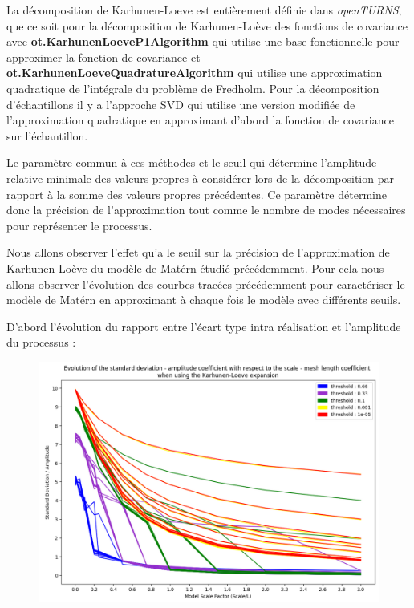 \documentclass[a4paper,10pt]{article}
\begin{document}
	 La décomposition de Karhunen-Loeve est entièrement définie dans \textit{openTURNS}, que ce soit pour la décomposition de Karhunen-Loève des fonctions de covariance avec \textbf{ot.KarhunenLoeveP1Algorithm} qui utilise une base fonctionnelle pour 	approximer la fonction de covariance et \\ \textbf{ot.KarhunenLoeveQuadratureAlgorithm} qui utilise une approximation quadratique de l'intégrale du problème de Fredholm. Pour la décomposition d'échantillons il y a l'approche SVD qui utilise une version modifiée de l'approximation quadratique en approximant d'abord la fonction de covariance sur l'échantillon. \par 
	 
	 Le paramètre commun à ces méthodes et le seuil qui détermine l'amplitude relative minimale des valeurs propres à considérer lors de la décomposition par rapport à la somme des valeurs propres précédentes. Ce paramètre détermine donc la précision de l'approximation tout comme le nombre de modes nécessaires pour représenter le processus. \par 
	 
	 Nous allons observer l'effet qu'a le seuil sur la précision de l'approximation de Karhunen-Loève du modèle de Matérn étudié précédemment. Pour cela nous allons observer l'évolution des courbes tracées précédemment pour caractériser le modèle de Matérn en approximant à chaque fois le modèle avec différents seuils. 
	 
	 D'abord l'évolution du rapport entre l'écart type intra réalisation et l'amplitude du processus : 
	 
\begin{figure}[H]
   \centering   
   \noindent \includegraphics[width = \linewidth]{stdDevIntraKL.png}
      \caption{}
         \label{stdDevIntraKL}
\end{figure}
	 
\end{document}

